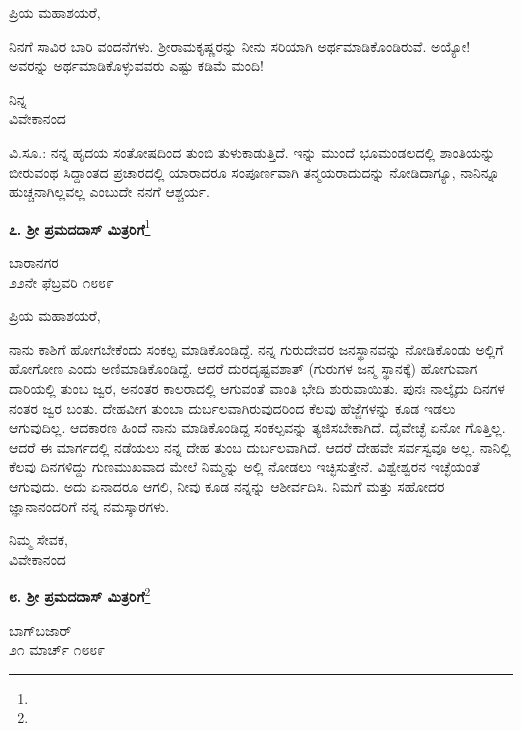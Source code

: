 \noindent
ಪ್ರಿಯ ಮಹಾಶಯರೆ,

ನಿನಗೆ ಸಾವಿರ ಬಾರಿ ವಂದನೆಗಳು. ಶ‍್ರೀರಾಮಕೃಷ್ಣರನ್ನು ನೀನು ಸರಿಯಾಗಿ ಅರ್ಥಮಾಡಿಕೊಂಡಿರುವೆ. ಅಯ್ಯೋ! ಅವರನ್ನು ಅರ್ಥಮಾಡಿಕೊಳ್ಳುವವರು ಎಷ್ಟು ಕಡಿಮೆ ಮಂದಿ!

\vspace{-0.3cm}

{\flushright
ನಿನ್ನ\\ವಿವೇಕಾನಂದ\par}

ವಿ.ಸೂ.:\enginline{-} ನನ್ನ ಹೃದಯ ಸಂತೋಷದಿಂದ ತುಂಬಿ ತುಳುಕಾಡುತ್ತಿದೆ. ಇನ್ನು ಮುಂದೆ ಭೂಮಂಡಲದಲ್ಲಿ ಶಾಂತಿಯನ್ನು ಬೀರುವಂಥ ಸಿದ್ದಾಂತದ ಪ್ರಚಾರದಲ್ಲಿ ಯಾರಾದರೂ ಸಂಪೂರ್ಣವಾಗಿ ತನ್ಮಯರಾದುದನ್ನು ನೋಡಿದಾಗ್ಯೂ, ನಾನಿನ್ನೂ ಹುಚ್ಚನಾಗಿಲ್ಲವಲ್ಲ ಎಂಬುದೇ ನನಗೆ ಆಶ್ಚರ್ಯ.

\begin{center}
\textbf{೭. ಶ‍್ರೀ ಪ್ರಮದದಾಸ್ ಮಿತ್ರರಿಗೆ}\footnote{}
\end{center}

\begin{flushright}
ಬಾರಾನಗರ\\೨೨ನೇ ಫೆಬ್ರವರಿ ೧೮೮೯
\end{flushright}

\noindent
ಪ್ರಿಯ ಮಹಾಶಯರೆ,

ನಾನು ಕಾಶಿಗೆ ಹೋಗಬೇಕೆಂದು ಸಂಕಲ್ಪ ಮಾಡಿಕೊಂಡಿದ್ದೆ. ನನ್ನ ಗುರುದೇವರ ಜನಸ್ಥಾನವನ್ನು ನೋಡಿಕೊಂಡು ಅಲ್ಲಿಗೆ ಹೋಗೋಣ ಎಂದು ಅಣಿಮಾಡಿಕೊಂಡಿದ್ದೆ. ಆದರೆ ದುರದೃಷ್ಟವಶಾತ್ (ಗುರುಗಳ ಜನ್ಮ ಸ್ಥಾನಕ್ಕೆ) ಹೋಗುವಾಗ ದಾರಿಯಲ್ಲಿ ತುಂಬ ಜ್ವರ, ಅನಂತರ ಕಾಲರಾದಲ್ಲಿ ಆಗುವಂತೆ ವಾಂತಿ ಭೇದಿ ಶುರುವಾಯಿತು. ಪುನಃ ನಾಲ್ಕೈದು ದಿನಗಳ ನಂತರ ಜ್ವರ ಬಂತು. ದೇಹವೀಗ ತುಂಬಾ ದುರ್ಬಲವಾಗಿರುವುದರಿಂದ ಕೆಲವು ಹೆಜ್ಜೆಗಳನ್ನು ಕೂಡ ಇಡಲು ಆಗುವುದಿಲ್ಲ. ಆದಕಾರಣ ಹಿಂದೆ ನಾನು ಮಾಡಿಕೊಂಡಿದ್ದ ಸಂಕಲ್ಪವನ್ನು ತ್ಯಜಿಸಬೇಕಾಗಿದೆ. ದೈವೇಚ್ಛೆ ಏನೋ ಗೊತ್ತಿಲ್ಲ. ಆದರೆ ಈ ಮಾರ್ಗದಲ್ಲಿ ನಡೆಯಲು ನನ್ನ ದೇಹ ತುಂಬ ದುರ್ಬಲವಾಗಿದೆ. ಆದರೆ ದೇಹವೇ ಸರ್ವಸ್ವವೂ ಅಲ್ಲ. ನಾನಿಲ್ಲಿ ಕೆಲವು ದಿನಗಳಿದ್ದು ಗುಣಮುಖವಾದ ಮೇಲೆ ನಿಮ್ಮನ್ನು ಅಲ್ಲಿ ನೋಡಲು ಇಚ್ಛಿಸುತ್ತೇನೆ. ವಿಶ್ವೇಶ್ವರನ ಇಚ್ಛೆಯಂತೆ ಆಗುವುದು. ಅದು ಏನಾದರೂ ಆಗಲಿ, ನೀವು ಕೂಡ ನನ್ನನ್ನು ಆಶೀರ್ವದಿಸಿ. ನಿಮಗೆ ಮತ್ತು ಸಹೋದರ ಜ್ಞಾನಾನಂದರಿಗೆ ನನ್ನ ನಮಸ್ಕಾರಗಳು.

{\flushright
ನಿಮ್ಮ ಸೇವಕ,\\ವಿವೇಕಾನಂದ\par}

\begin{center}
\textbf{೮. ಶ‍್ರೀ ಪ್ರಮದದಾಸ್‌ ಮಿತ್ರರಿಗೆ}\footnote{}
\end{center}

\begin{flushright}
ಬಾಗ್‌ಬಜಾರ್\\೨೧ ಮಾರ್ಚ್ ೧೮೮೯
\end{flushright}

